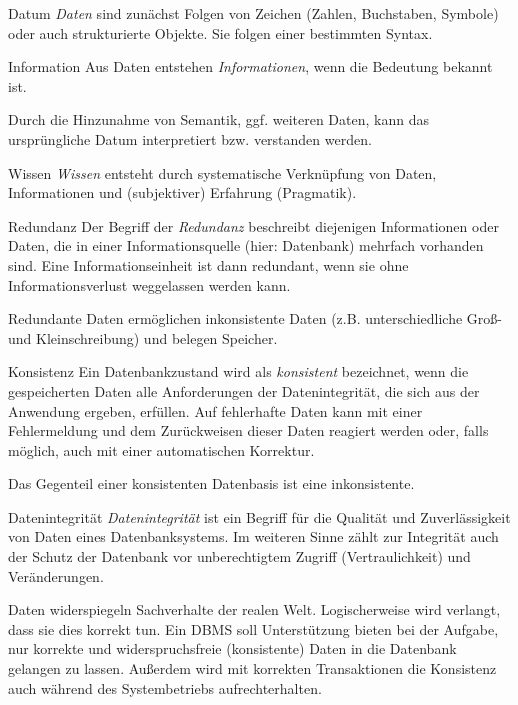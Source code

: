 \begin{bonus}{Datum}
    \emph{Daten} sind zunächst Folgen von Zeichen (Zahlen, Buchstaben, Symbole) oder auch strukturierte Objekte.
    Sie folgen einer bestimmten Syntax.
\end{bonus}

\begin{bonus}{Information}
    Aus Daten entstehen \emph{Informationen}, wenn die Bedeutung bekannt ist.

    Durch die Hinzunahme von Semantik, ggf. weiteren Daten, kann das ursprüngliche Datum interpretiert bzw. verstanden werden.
\end{bonus}

\begin{bonus}{Wissen}
    \emph{Wissen} entsteht durch systematische Verknüpfung von Daten, Informationen und (subjektiver) Erfahrung (Pragmatik).
\end{bonus}

\begin{defi}{Redundanz}
    Der Begriff der \emph{Redundanz} beschreibt diejenigen Informationen oder Daten, die in einer Informationsquelle (hier: Datenbank) mehrfach vorhanden sind.
    Eine Informationseinheit ist dann redundant, wenn sie ohne Informationsverlust weggelassen werden kann.

    Redundante Daten ermöglichen inkonsistente Daten (z.B. unterschiedliche Groß- und Kleinschreibung) und belegen Speicher.
\end{defi}

\begin{defi}{Konsistenz}
    Ein Datenbankzustand wird als \emph{konsistent} bezeichnet, wenn die gespeicherten Daten alle Anforderungen der Datenintegrität, die sich aus der Anwendung ergeben, erfüllen.
    Auf fehlerhafte Daten kann mit einer Fehlermeldung und dem Zurückweisen dieser Daten reagiert werden oder, falls möglich, auch mit einer automatischen Korrektur.

    Das Gegenteil einer konsistenten Datenbasis ist eine inkonsistente.
\end{defi}

\begin{defi}{Datenintegrität}
    \emph{Datenintegrität} ist ein Begriff für die Qualität und Zuverlässigkeit von Daten eines Datenbanksystems.
    Im weiteren Sinne zählt zur Integrität auch der Schutz der Datenbank vor unberechtigtem Zugriff (Vertraulichkeit) und Veränderungen.

    Daten widerspiegeln Sachverhalte der realen Welt.
    Logischerweise wird verlangt, dass sie dies korrekt tun.
    Ein DBMS soll Unterstützung bieten bei der Aufgabe, nur korrekte und widerspruchsfreie (konsistente) Daten in die Datenbank gelangen zu lassen.
    Außerdem wird mit korrekten Transaktionen die Konsistenz auch während des Systembetriebs aufrechterhalten.
\end{defi}

